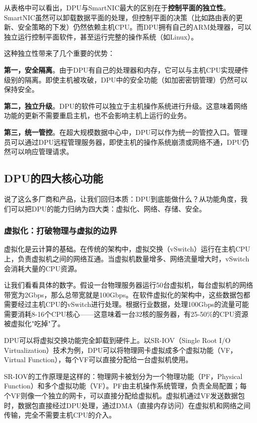从表格中可以看出，DPU与SmartNIC最大的区别在于\textbf{控制平面的独立性}。SmartNIC虽然可以卸载数据平面的处理，但控制平面的决策（比如路由表的更新、安全策略的下发）仍然依赖主机CPU。而DPU拥有自己的ARM处理器，可以独立运行控制平面软件，甚至运行完整的操作系统（如Linux）。

这种独立性带来了几个重要的优势：

\textbf{第一，安全隔离}。由于DPU有自己的处理器和内存，它可以与主机CPU实现硬件级别的隔离。即使主机被攻破，DPU中的安全功能（如加密密钥管理）仍然可以保持安全。

\textbf{第二，独立升级}。DPU的软件可以独立于主机操作系统进行升级。这意味着网络功能的更新不需要重启主机，也不会影响主机上运行的业务。

\textbf{第三，统一管控}。在超大规模数据中心中，DPU可以作为统一的管控入口。管理员可以通过DPU远程管理服务器，即使主机的操作系统崩溃或网络不通，DPU仍然可以响应管理请求。

\subsection{DPU的四大核心功能}

说了这么多厂商和产品，让我们回归本质：DPU到底能做什么？从功能角度，我们可以把DPU的能力归纳为四大类：虚拟化、网络、存储、安全。

\subsubsection{虚拟化：打破物理与虚拟的边界}

虚拟化是云计算的基础。在传统的架构中，虚拟交换（vSwitch）运行在主机CPU上，负责虚拟机之间的网络互通。当虚拟机数量增多、网络流量增大时，vSwitch会消耗大量的CPU资源。

让我们看看具体的数字。假设一台物理服务器运行50台虚拟机，每台虚拟机的网络带宽为2Gbps，那么总带宽就是100Gbps。在软件虚拟化的架构中，这些数据包都需要经过主机CPU的vSwitch进行处理。根据行业数据，处理100Gbps的流量可能需要消耗8-16个CPU核心——这意味着一台32核的服务器，有25-50\%的CPU资源被虚拟化"吃掉"了。

DPU可以将虚拟交换功能完全卸载到硬件上。以SR-IOV（Single Root I/O Virtualization）技术为例，DPU可以将物理网卡虚拟成多个虚拟功能（VF，Virtual Function），每个VF可以直接分配给一台虚拟机使用。

SR-IOV的工作原理是这样的：物理网卡被划分为一个物理功能（PF，Physical Function）和多个虚拟功能（VF）。PF由主机操作系统管理，负责全局配置；每个VF则像一个独立的网卡，可以直接分配给虚拟机。虚拟机通过VF发送数据包时，数据包直接经过DPU处理，通过DMA（直接内存访问）在虚拟机和网络之间传输，完全不需要主机CPU的介入。

